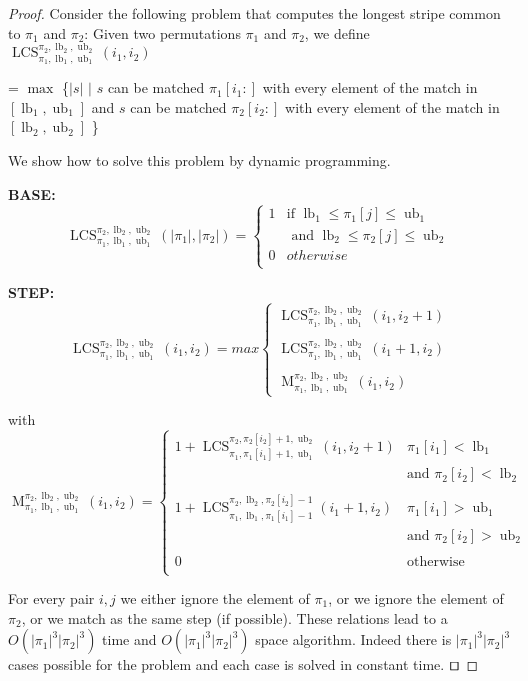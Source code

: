 \documentclass[a4paper]{llncs}
\DeclareMathOperator{\lb}{lb}
\DeclareMathOperator{\ub}{ub}
\DeclareMathOperator{\LCSa}{LCS}
\newcommand{\LCS}[8]{\LCSa_{{#1},{#2},{#3}}^{{#4},{#5},{#6}}({#7},{#8})}
\DeclareMathOperator{\matcha}{M}
\newcommand{\match}[8]{\matcha_{{#1},{#2},{#3}}^{{#4},{#5},{#6}}({#7},{#8})}
\begin{document}
\begin{proof}
Consider the following problem
that computes the longest stripe common to $\pi_1$ and $\pi_2$:
Given two permutations $\pi_1$ and $\pi_2$, we define
$
\LCS{\pi_1}{\lb_1}{\ub_1}{\pi_2}{\lb_2}{\ub_2}{i_1}{i_2}
$
\begin{center}
= $\max$ \{$|s|$ $|$ $s$ can be matched $\pi_1[i_1:]$ with every element of the match in $[\lb_1,\ub_1]$ and $s$ can be matched $\pi_2[i_2:]$ with every element of the match in $[\lb_2,\ub_2]$ \}
\end{center}



We show how to solve this problem by dynamic programming.

\noindent\textbf{BASE:}
$$
\LCS{\pi_1}{\lb_1}{\ub_1}{\pi_2}{\lb_2}{\ub_2}{|\pi_1|}{|\pi_2|} =
\begin{cases}
	1 & \text{if $\lb_1 \leq \pi_1[j] \leq \ub_1$
	}\\
	& \text{ and $\lb_2 \leq \pi_2[j] \leq \ub_2$}\\
	0 & otherwise\\
\end{cases}
$$

\noindent\textbf{STEP:}
$$
\LCS{\pi_1}{\lb_1}{\ub_1}{\pi_2}{\lb_2}{\ub_2}{i_1}{i_2}=max
\begin{cases}
	\LCS{\pi_1}{\lb_1}{\ub_1}{\pi_2}{\lb_2}{\ub_2}{i_1}{i_2+1} \\
	\\
	\LCS{\pi_1}{\lb_1}{\ub_1}{\pi_2}{\lb_2}{\ub_2}{i_1+1}{i_2} \\
	\\
	\match{\pi_1}{\lb_1}{\ub_1}{\pi_2}{\lb_2}{\ub_2}{i_1}{i_2}
\end{cases}
$$

with \\
$
\match{\pi_1}{\lb_1}{\ub_1}{\pi_2}{\lb_2}{\ub_2}{i_1}{i_2}=
\begin{cases}
1+\LCS{\pi_1}{\pi_1[i_1]+1}{\ub_1}{\pi_2}{\pi_2[i_2]+1}{\ub_2}{i_1}{i_2+1}
	& \text{$\pi_1[i_1]<\lb_1$ } \\
	& \text{and $\pi_2[i_2]<\lb_2$} \\

&\\

1+\LCS{\pi_1}{\lb_1}{\pi_1[i_1]-1}{\pi_2}{\lb_2}{\pi_2[i_2]-1}{i_1+1}{i_2}
	& \text{$\pi_1[i_1]>\ub_1$ } \\
	&\text{and $\pi_2[i_2]>\ub_2$}\\

&\\

0 	& \text{otherwise}\\
\end{cases}
$


For every pair $i,j$ we either ignore the element of $\pi_1$,
or we ignore the element of $\pi_2$,
or we match as the same step (if possible).
These relations lead to a $O(|\pi_1|^3|\pi_2|^3)$ time and $O(|\pi_1|^3|\pi_2|^3)$ space algorithm.
Indeed there is $|\pi_1|^3|\pi_2|^3$ cases possible for the problem
and each case is solved in constant time.
$\qed$
\end{proof}
\end{document}
